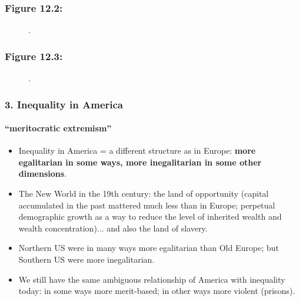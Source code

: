 \documentclass[t]{beamer}\usepackage[]{graphicx}\usepackage[]{color}
\begin{document}
\begin{frame}[label=Figure_12_2]
\frametitle{Figure 12.2: }
\begin{figure}[t]
\begin{minipage}[b]{\textwidth}
\centering

\caption{.}
\end{minipage}
\end{figure}
\end{frame}


\begin{frame}[label=Figure_12_3]
\frametitle{Figure 12.3: }
\begin{figure}[t]
\begin{minipage}[b]{\textwidth}
\centering

\caption{.}
\end{minipage}
\end{figure}
\end{frame}






\begin{frame}[label=InequalityUSA]
\frametitle{3. Inequality in America}
\framesubtitle{``meritocratic extremism''}
\begin{itemize}
\item
Inequality in America = a different structure as in Europe: 
\textbf{more egalitarian in some ways, more inegalitarian in some other dimensions}.
\item
The New World in the 19th century: the land of opportunity (capital accumulated in the past mattered much less than in Europe; perpetual demographic growth as a way to reduce the level of inherited wealth and wealth concentration)... and also the land of slavery.
\item 
Northern US were in many ways more egalitarian than Old Europe; but Southern US were more inegalitarian.
\item 
We still have the same ambiguous relationship of America with inequality today: in some ways more merit-based; in other ways more violent (prisons).
\end{itemize}
\end{frame}
\end{document}
